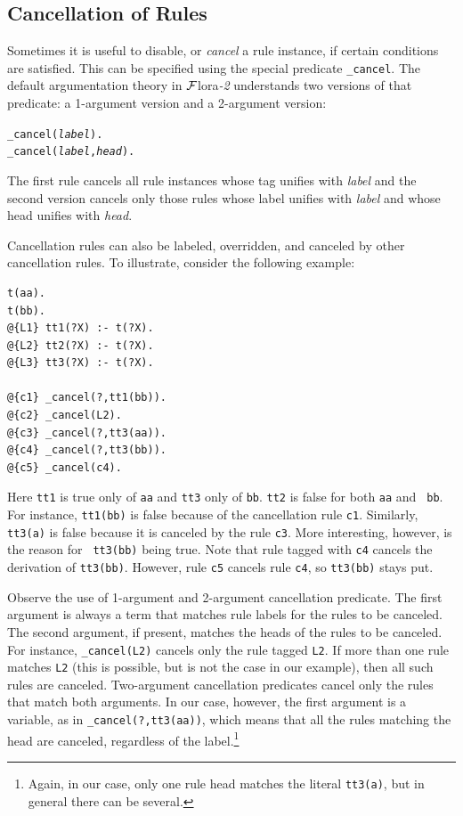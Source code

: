 \documentclass[11pt]{article}
\newcommand{\FLORA}{{\mbox{\sc ${\cal F}${lora}\rm\emph{-2}}}\xspace}
\begin{document}
\subsection{Cancellation of Rules}\label{sec-cancel}

Sometimes it is useful to disable, or \emph{cancel} a rule instance, if
certain conditions are satisfied. This can be specified using the special
predicate {\tt \_cancel}. The default argumentation theory in \FLORA  
understands two versions of that predicate: a 1-argument version and a
2-argument version:
\begin{alltt}
    _cancel(\emph{label}).
    _cancel(\emph{label},\emph{head}).
\end{alltt}
The first rule cancels all rule instances whose tag unifies with
\emph{label} and the second version cancels only those rules whose label
unifies with \emph{label} and whose head unifies with \emph{head}.   

Cancellation rules can also be labeled, overridden,
and canceled by other cancellation
rules. To illustrate,  consider the following example:
\begin{verbatim}
t(aa).
t(bb).
@{L1} tt1(?X) :- t(?X).
@{L2} tt2(?X) :- t(?X).
@{L3} tt3(?X) :- t(?X).

@{c1} _cancel(?,tt1(bb)).
@{c2} _cancel(L2).
@{c3} _cancel(?,tt3(aa)).
@{c4} _cancel(?,tt3(bb)).
@{c5} _cancel(c4).
\end{verbatim}
Here {\tt tt1} is true only of {\tt aa} and  
{\tt tt3} only of {\tt bb}. {\tt tt2} is false for both {\tt aa} and {\tt
  bb}. For instance, {\tt tt1(bb)} is false because of the cancellation
rule {\tt c1}. Similarly, {\tt tt3(a)} is false because it is canceled by
the rule {\tt c3}.   More interesting, however, is the reason for {\tt
  tt3(bb)} being true. Note that rule tagged with {\tt c4} cancels the
derivation of {\tt tt3(bb)}. However, rule {\tt c5} cancels rule {\tt c4},
so {\tt tt3(bb)} stays put.

Observe the use of 1-argument and 2-argument cancellation predicate.
The first argument is always a term that matches rule labels for the rules
to be canceled. The second
argument, if present, matches the heads of the rules to be canceled. For
instance, {\tt \_cancel(L2)} cancels only the rule tagged {\tt L2}. If more
than one rule matches {\tt L2} (this is possible, but is not the case in
our example), then all such rules are canceled. Two-argument cancellation
predicates cancel only the rules that match both arguments. In our case,
however, the first argument is a variable, as in {\tt \_cancel(?,tt3(aa))},
which means that all the rules matching the head are canceled, regardless
of the label.\footnote{
  Again, in our case, only one rule head matches the literal {\tt tt3(a)},
  but in general there can be several.
}
\end{document}
